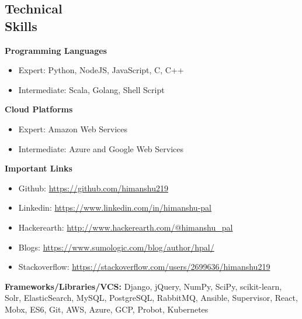 \documentclass[margin,line]{resume}
\begin{document}
\begin{resume}
    \section{\mysidestyle Technical \\ Skills}
    \vspace{0mm}
     \textbf{Programming Languages}
     \begin{itemize}
          \item Expert: Python, NodeJS, JavaScript, C, C++
          \item Intermediate: Scala, Golang, Shell Script
     \end{itemize}
     \textbf{Cloud Platforms}
     \begin{itemize}
          \item Expert: Amazon Web Services
          \item Intermediate: Azure and Google Web Services
     \end{itemize}
     \textbf{Important Links}
     \begin{itemize}
          \item Github: \url{https://github.com/himanshu219}
          \item Linkedin: \url{https://www.linkedin.com/in/himanshu-pal}
          \item Hackerearth: \url{http://www.hackerearth.com/@himanshu_pal}
          \item Blogs: \url{https://www.sumologic.com/blog/author/hpal/}
          \item Stackoverflow: \url{https://stackoverflow.com/users/2699636/himanshu219}
     \end{itemize}
      \textbf{Frameworks/Libraries/VCS:} Django, jQuery, NumPy, SciPy, scikit-learn, Solr, ElasticSearch, MySQL, PostgreSQL, RabbitMQ, Ansible, Supervisor, React, Mobx, ES6, Git, AWS, Azure, GCP, Probot, Kubernetes

\end{resume}
\end{document}
